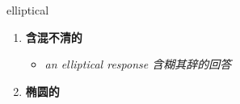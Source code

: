 
\begin{frame}
{\huge elliptical}
\begin{center}
\begin{enumerate}\Large
  \item \textbf{含混不清的}
  \begin{itemize}
    \item \em{\Large{an elliptical response 含糊其辞的回答}}
  \end{itemize}
  \item \textbf{椭圆的}
\end{enumerate}
\end{center}
\end{frame}
